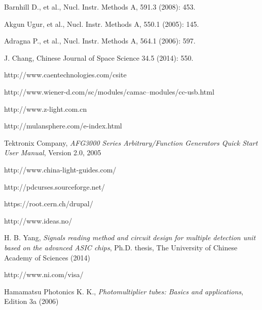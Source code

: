 \documentclass[a4paper,10pt,twoside]{cpc-hepnp}
\begin{document}
\begin{CJK*}{UTF8}{gbsn}
\begin{multicols}{2}

\begin{thebibliography}{90}

\vspace{3mm}
Barnhill D., et al., Nucl. Instr. Methods A, 591.3 (2008): 453.

Akgun Ugur, et al., Nucl. Instr. Methods A, 550.1 (2005): 145.

Adragna P., et al., Nucl. Instr. Methods A, 564.1 (2006): 597.

J. Chang, Chinese Journal of Space Science 34.5 (2014): 550.

http://www.caentechnologies.com/csite

http://www.wiener-d.com/sc/modules/camac--modules/cc-usb.html

http://www.z-light.com.cn

http://mulansphere.com/e-index.html

Tektronix Company, \emph{AFG3000 Series Arbitrary/Function Generators Quick Start User Manual}, Version 2.0, 2005

http://www.china-light-guides.com/

http://pdcurses.sourceforge.net/

https://root.cern.ch/drupal/

http://www.ideas.no/

H. B. Yang, \emph{Signals reading method and circuit design for multiple detection
unit based on the advanced ASIC chips}, Ph.D. thesis, The University of Chinese
Academy of Sciences (2014)


http://www.ni.com/visa/

Hamamatsu Photonics K. K., \emph{Photomultiplier tubes: Basics and applications},  Edition 3a (2006)

\end{thebibliography}
\end{multicols}


\end{CJK*}
\end{document}
